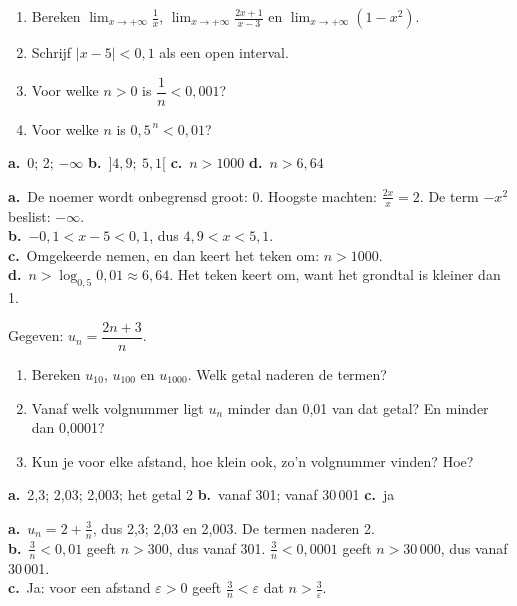 \begin{oefeningen}[Start]
\begin{oefening}
\begin{enumerate}
  \item Bereken $\displaystyle\lim_{x\to+\infty} \frac{1}{x}$, $\displaystyle\lim_{x\to+\infty} \frac{2x+1}{x-3}$ en $\displaystyle\lim_{x\to+\infty} (1 - x^2)$.
  \item Schrijf $|x - 5| < 0{,}1$ als een open interval.
  \item Voor welke $n > 0$ is $\dfrac{1}{n} < 0{,}001$?
  \item Voor welke $n$ is $0{,}5^{\,n} < 0{,}01$?
\end{enumerate}
\begin{solution}
\textbf{a.}~0; 2; $-\infty$ \quad \textbf{b.}~$]4{,}9;\ 5{,}1[$ \quad \textbf{c.}~$n>1000$ \quad \textbf{d.}~$n>6{,}64$
\end{solution}
\begin{fullsolution}
\textbf{a.}~De noemer wordt onbegrensd groot: 0. Hoogste machten: $\tfrac{2x}{x}=2$. De term $-x^2$ beslist: $-\infty$.\\
\textbf{b.}~$-0{,}1<x-5<0{,}1$, dus $4{,}9<x<5{,}1$.\\
\textbf{c.}~Omgekeerde nemen, en dan keert het teken om: $n>1000$.\\
\textbf{d.}~$n>\log_{0{,}5} 0{,}01\approx 6{,}64$. Het teken keert om, want het grondtal is kleiner dan 1.
\end{fullsolution}
\end{oefening}

\begin{oefening}\label{oef:h4-verken}
\quad Gegeven: $u_n = \dfrac{2n+3}{n}$.
\begin{enumerate}
  \item Bereken $u_{10}$, $u_{100}$ en $u_{1000}$. Welk getal naderen de termen?
  \item Vanaf welk volgnummer ligt $u_n$ minder dan 0,01 van dat getal? En minder dan 0,0001?
  \item Kun je voor elke afstand, hoe klein ook, zo'n volgnummer vinden? Hoe?
\end{enumerate}
\begin{solution}
\textbf{a.}~2,3; 2,03; 2,003; het getal 2 \quad \textbf{b.}~vanaf 301; vanaf 30\,001 \quad \textbf{c.}~ja
\end{solution}
\begin{fullsolution}
\textbf{a.}~$u_n=2+\tfrac3n$, dus 2,3; 2,03 en 2,003. De termen naderen 2.\\
\textbf{b.}~$\tfrac3n<0{,}01$ geeft $n>300$, dus vanaf 301. $\tfrac3n<0{,}0001$ geeft $n>30\,000$, dus vanaf 30\,001.\\
\textbf{c.}~Ja: voor een afstand $\varepsilon>0$ geeft $\tfrac3n<\varepsilon$ dat $n>\tfrac{3}{\varepsilon}$.
\end{fullsolution}
\end{oefening}
\end{oefeningen}

